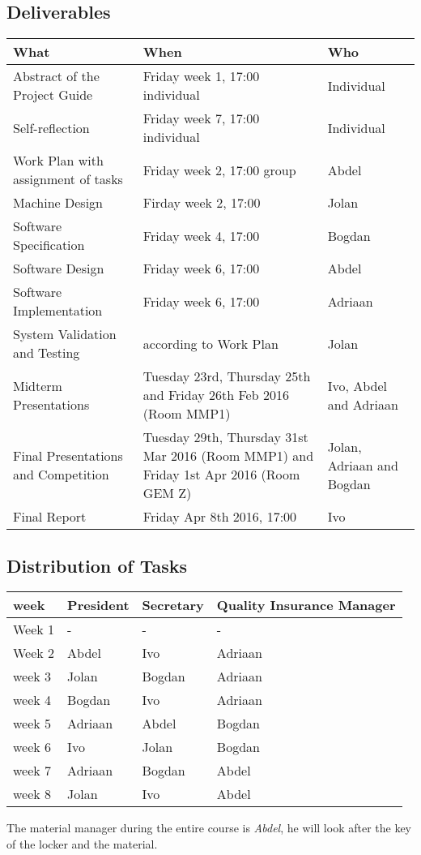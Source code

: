\subsection{Deliverables}
  \begin{center}
  \begin{tabular}{p{4cm} | p{4.5cm} | p{3cm}}
  \textbf{What} 								& \textbf{When} 					& \textbf{Who} \\ \hline
  Abstract of the Project Guide 				& Friday week 1, 17:00 individual 					& Individual \\
  Self-reflection 								& Friday week 7, 17:00 individual 	& Individual \\
  Work Plan with assignment of tasks 			& Friday week 2, 17:00 group 		& Abdel \\
  Machine Design 								& Firday week 2, 17:00 				& Jolan \\
  Software Specification 						& Friday week 4, 17:00 				& Bogdan \\
  Software Design 								& Friday week 6, 17:00 				& Abdel \\
  Software Implementation 						& Friday week 6, 17:00  			& Adriaan\\
  System Validation and Testing 				& according to Work Plan 			& Jolan \\
  Midterm Presentations 						& Tuesday 23rd, Thursday 25th and Friday 26th Feb 2016 (Room MMP1) & Ivo, Abdel \newline and Adriaan \\
  Final Presentations and Competition 			& Tuesday 29th, Thursday 31st Mar 2016 (Room MMP1) and Friday 1st Apr 2016 (Room GEM Z)  & Jolan, Adriaan \newline and Bogdan \\
  Final Report 									& Friday Apr 8th 2016, 17:00 		& Ivo 
  \end{tabular}
  \end{center}


\subsection{Distribution of Tasks}
  \begin{center}
  \begin{tabular}{l | l | l | l}
  \textbf{week} & \textbf{President} & \textbf{Secretary} & \textbf{Quality Insurance Manager} \\ \hline
  Week 1 & - 			& - 		& - 		\\
  Week 2 & Abdel 		& Ivo 		& Adriaan 	\\
  week 3 & Jolan 		& Bogdan 	& Adriaan 	\\
  week 4 & Bogdan	 	& Ivo 		& Adriaan 	\\
  week 5 & Adriaan 		& Abdel 	& Bogdan 	\\
  week 6 & Ivo 			& Jolan 	& Bogdan 	\\ 
  week 7 & Adriaan	 	& Bogdan 	& Abdel 	\\
  week 8 & Jolan 		& Ivo 		& Abdel 	\\
  \end{tabular}
  \end{center}

The material manager during the entire course is \emph{Abdel}, he will look after the key of the locker and the material.